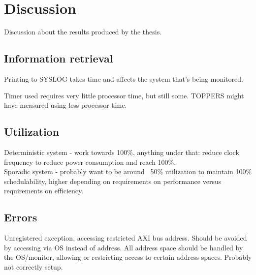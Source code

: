 \chapter{Discussion}
Discussion about the results produced by the thesis.

\section{Information retrieval}
Printing to SYSLOG takes time and affects the system that's being monitored.

Timer used requires very little processor time, but still some. TOPPERS might have measured using less processor time.

\section{Utilization}
Deterministic system - work towards 100\%, anything under that: reduce clock frequency to reduce power consumption and reach 100\%.\\

Sporadic system - probably want to be around ~50\% utilization to maintain 100\% schedulability, higher depending on requirements on performance versus requirements on efficiency.

\section{Errors}
Unregistered exception, accessing restricted AXI bus address. Should be avoided by accessing via OS instead of address. All address space should be handled by the OS/monitor, allowing or restricting access to certain address spaces. Probably not correctly setup.
